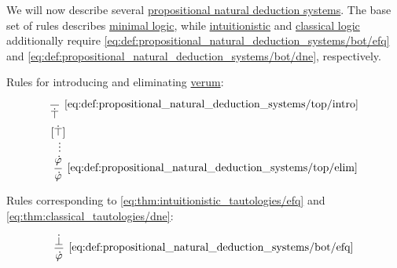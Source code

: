 \begin{definition}\label{def:propositional_natural_deduction_systems}
  We will now describe several \hyperref[def:propositional_natural_deduction_system]{propositional natural deduction systems}. The base set of rules describes \hyperref[def:minimal_logic]{minimal logic}, while \hyperref[def:intuitionistic_logic]{intuitionistic} and \hyperref[def:classical_logic]{classical logic} additionally require \ref{eq:def:propositional_natural_deduction_systems/bot/efq} and \ref{eq:def:propositional_natural_deduction_systems/bot/dne}, respectively.

  \begin{thmenum}
    \mimprovised Rules for introducing and eliminating \hyperref[def:propositional_alphabet/constants/verum]{verum}:
    \begin{TwoColumns}
      \begin{equation*}\taglabel[\( \top^+ \)]{eq:def:propositional_natural_deduction_systems/top/intro}
        \begin{prooftree}
          \infer0[\ref{eq:def:propositional_natural_deduction_systems/top/intro}]{ \syntop }
        \end{prooftree}
      \end{equation*}
    \BeginSecondColumn
      \begin{equation*}\taglabel[\( \top^- \)]{eq:def:propositional_natural_deduction_systems/top/elim}
        \begin{prooftree}
          \hypo{ [\syntop] }
          \ellipsis {} { \syn\varphi }
          \infer1[\ref{eq:def:propositional_natural_deduction_systems/top/elim}]{ \syn\varphi }
        \end{prooftree}
      \end{equation*}
    \end{TwoColumns}

     Rules corresponding to \eqref{eq:thm:intuitionistic_tautologies/efq} and \eqref{eq:thm:classical_tautologies/dne}:
    \begin{TwoColumns}
      \begin{equation*}\taglabel[\logic{EFQ}]{eq:def:propositional_natural_deduction_systems/bot/efq}
        \begin{prooftree}
          \hypo{ \synbot }
          \infer1[\ref{eq:def:propositional_natural_deduction_systems/bot/efq}]{ \syn\varphi }
        \end{prooftree}
      \end{equation*}


\end{TwoColumns}
\end{thmenum}
\end{definition}
